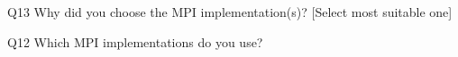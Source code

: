 \begin{description}%
\item{Q13} Why did you choose the MPI implementation(s)? [Select most suitable one]%
\item{Q12} Which MPI implementations do you use?%
\end{description}%
